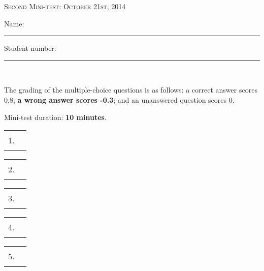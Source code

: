 \documentclass{docist}
\begin{document}
\thispagestyle{empty}

\begin{center}
  {\Large \textsc{Second Mini-test: October 21st, 2014\\[2ex]}}
  {\normalsize    Name: \rule{8cm}{1pt} Student number: \rule{2cm}{1pt}\\[2ex]}
\end{center}

The grading of the multiple-choice questions is as follows: a correct answer scores 0.8; \textbf{a wrong answer scores -0.3}; and an unanswered question scores 0. 

Mini-test duration: \textbf{10 minutes}. 

\begin{center}
%
  \begin{tabular}{rc}
    1. & \rule{1cm}{1pt} \\[2ex]
  \end{tabular}
  \hspace*{0.7cm}
  \begin{tabular}{rc}
    2. & \rule{1cm}{1pt} \\[2ex]
  \end{tabular}
  \hspace*{0.7cm}
  \begin{tabular}{rc}
    3. & \rule{1cm}{1pt} \\[2ex]
  \end{tabular}
  \hspace*{0.7cm}
  \begin{tabular}{rc}
    4. & \rule{1cm}{1pt} \\[2ex]
  \end{tabular}
  \hspace*{0.7cm}
  \begin{tabular}{rc}
    5. & \rule{1cm}{1pt} \\[2ex]
  \end{tabular}
\end{center}



\qAvailabilityScenario

\qPingEcho

\qGraphiteTechnicaAndNonTechnicalUsers

\qFirewall

\qChromeTabSecurity
\end{document}
